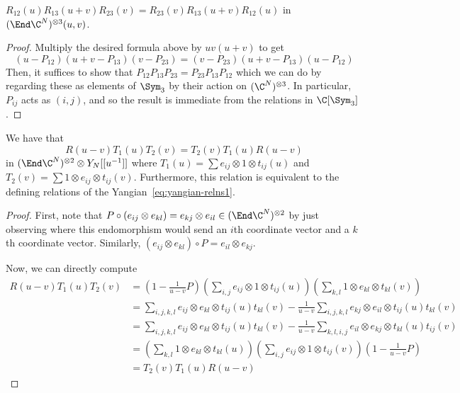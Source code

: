 \documentclass[11pt,leqno,oneside]{amsbook}
\numberwithin{thm}{section}
\begin{document}
\begin{prop}
  \(R_{12}(u)R_{13}(u+v)R_{23}(v) = R_{23}(v)R_{13}(u+v)R_{12}(u)\) in
  \((\End \C^N)^{\otimes 3}(u,v)\).
\end{prop}
\begin{proof}
  Multiply the desired formula above by \(uv(u+v)\) to get \[
    (u-P_{12})(u+v-P_{13})(v-P_{23}) = (v-P_{23})(u+v-P_{13})(u-P_{12})
  \]
  Then, it suffices to show that \(P_{12}P_{13}P_{23} =
  P_{23}P_{13}P_{12}\) which we can do by regarding these as elements
  of \(\Sym_3\) by their action on \((\C^N)^{\otimes 3}\). In
  particular, \(P_{ij}\) acts as \((i,j)\), and so the result is
  immediate from the relations in \(\C[\Sym_3]\).
\end{proof}
\begin{thm}\label{rtt-relations}
  We have that 
  \[
    R(u-v)T_1(u)T_2(v) = T_2(v)T_1(u)R(u-v)
  \] in \((\End
  \C^N)^{\otimes 2} \otimes Y_N[[u^{-1}]]\) where \(T_1(u) = \sum
  e_{ij} \otimes 1 \otimes t_{ij}(u)\) and \(T_2(v) = \sum 1 \otimes
  e_{ij} \otimes t_{ij}(v)\). Furthermore, this relation is equivalent
  to the defining relations of the Yangian~\ref{eq:yangian-relns1}.
\end{thm}
\begin{proof}
  First, note that \(P \circ (e_{ij} \otimes e_{kl}) = e_{kj} \otimes
  e_{il} \in (\End \C^N)^{\otimes 2}\) by just observing where this
  endomorphism would send an \(i\)th coordinate vector and a \(k\)th
  coordinate vector. Similarly, \((e_{ij} \otimes e_{kl}) \circ P =
  e_{il} \otimes e_{kj}\).
  
  Now, we can directly compute
  \begin{align*}
    R(u-v)T_1(u)T_2(v)
    & = \left( 1-\frac{1}{u-v}P \right)\left( \sum_{i,j} e_{ij}
      \otimes 1 \otimes t_{ij}(u) \right) \left( \sum_{k,l} 1 \otimes
      e_{kl} \otimes t_{kl}(v) \right) \\
    & = \sum_{i,j,k,l} e_{ij} \otimes e_{kl} \otimes t_{ij}(u)t_{kl}(v) -
      \frac{1}{u-v} \sum_{i,j,k,l} e_{kj} \otimes e_{il} \otimes
      t_{ij}(u)t_{kl}(v)\\
    & = \sum_{i,j,k,l} e_{ij} \otimes e_{kl} \otimes t_{ij}(u)t_{kl}(v) -
      \frac{1}{u-v} \sum_{k,l,i,j} e_{il} \otimes e_{kj} \otimes
      t_{kl}(u)t_{ij}(v)\\
    & = \left( \sum_{k,l} 1 \otimes
      e_{kl} \otimes t_{kl}(u) \right) \left( \sum_{i,j} e_{ij}
      \otimes 1 \otimes t_{ij}(v) \right) \left( 1-\frac{1}{u-v}P
      \right) \\
    & = T_2(v)T_1(u)R(u-v)
  \end{align*}
\end{proof}
\end{document}
